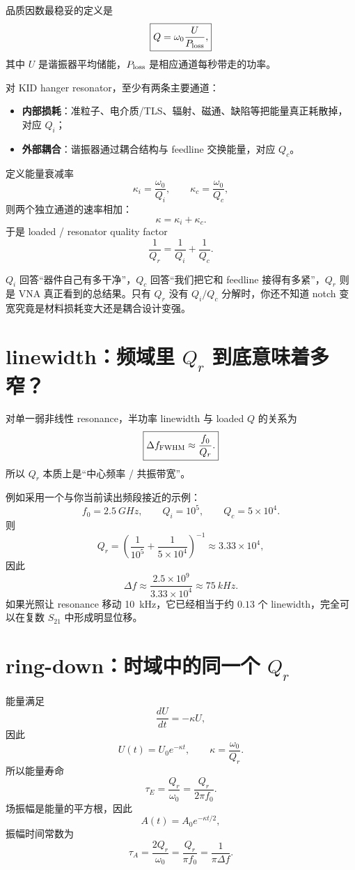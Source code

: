 \documentclass[11pt,a4paper,openany]{ctexrep}
\begin{document}
品质因数最稳妥的定义是
\[
\boxed{
Q=\omega_0\frac{U}{P_{\rm loss}},
}
\]
其中 $U$ 是谐振器平均储能，$P_{\rm loss}$ 是相应通道每秒带走的功率。

对 KID hanger resonator，至少有两条主要通道：
\begin{itemize}
  \item \textbf{内部损耗}：准粒子、电介质/TLS、辐射、磁通、缺陷等把能量真正耗散掉，对应 $Q_i$；
  \item \textbf{外部耦合}：谐振器通过耦合结构与 feedline 交换能量，对应 $Q_c$。
\end{itemize}

定义能量衰减率
\[
\kappa_i=\frac{\omega_0}{Q_i},
\qquad
\kappa_c=\frac{\omega_0}{Q_c},
\]
则两个独立通道的速率相加：
\[
\kappa=\kappa_i+\kappa_c.
\]
于是 loaded / resonator quality factor
\[
\boxed{
\frac{1}{Q_r}=\frac{1}{Q_i}+\frac{1}{Q_c}.
}
\]

\begin{intuitionbox}
$Q_i$ 回答“器件自己有多干净”，$Q_c$ 回答“我们把它和 feedline 接得有多紧”，$Q_r$ 则是 VNA 真正看到的总结果。只有 $Q_r$ 没有 $Q_i/Q_c$ 分解时，你还不知道 notch 变宽究竟是材料损耗变大还是耦合设计变强。
\end{intuitionbox}

\section{linewidth：频域里 $Q_r$ 到底意味着多窄？}

对单一弱非线性 resonance，半功率 linewidth 与 loaded $Q$ 的关系为
\[
\boxed{
\Delta f_{\rm FWHM}\approx\frac{f_0}{Q_r}.
}
\]
所以 $Q_r$ 本质上是“中心频率 / 共振带宽”。

例如采用一个与你当前读出频段接近的示例：
\[
f_0=\SI{2.5}{GHz},\qquad Q_i=10^5,\qquad Q_c=5\times10^4.
\]
则
\[
Q_r=\left(\frac1{10^5}+\frac1{5\times10^4}\right)^{-1}
\approx3.33\times10^4,
\]
因此
\[
\boxed{
\Delta f\approx\frac{2.5\times10^9}{3.33\times10^4}
\approx\SI{75}{kHz}.
}
\]
如果光照让 resonance 移动 \SI{10}{kHz}，它已经相当于约 $0.13$ 个 linewidth，完全可以在复数 $S_{21}$ 中形成明显位移。

\section{ring-down：时域中的同一个 $Q_r$}

能量满足
\[
\frac{dU}{dt}=-\kappa U,
\]
因此
\[
U(t)=U_0e^{-\kappa t},
\qquad
\kappa=\frac{\omega_0}{Q_r}.
\]
所以能量寿命
\[
\boxed{
\tau_E=\frac{Q_r}{\omega_0}=\frac{Q_r}{2\pi f_0}.
}
\]
场振幅是能量的平方根，因此
\[
A(t)=A_0e^{-\kappa t/2},
\]
振幅时间常数为
\[
\boxed{
\tau_A=\frac{2Q_r}{\omega_0}=\frac{Q_r}{\pi f_0}
=\frac{1}{\pi\Delta f}.
}
\]
\end{document}

